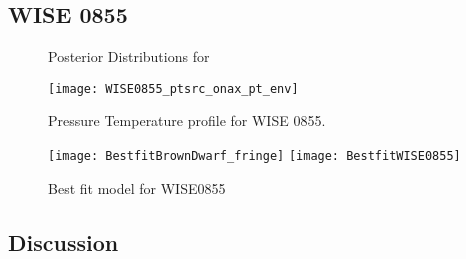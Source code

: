 \subsection{WISE 0855}
\begin{figure}[h]
	\caption{Posterior Distributions for}
	\label{fig:postWISE}
\end{figure}
\begin{figure}[h]
	\texttt{[image: WISE0855\_ptsrc\_onax\_pt\_env]}
	\caption{Pressure Temperature profile for WISE 0855.}
	\label{fig:presWISE}
\end{figure}
\begin{figure}[h]
	\texttt{[image: BestfitBrownDwarf\_fringe]}
	\texttt{[image: BestfitWISE0855]}
	\caption{Best fit model for WISE0855}
	\label{fig:bestfitWISE}
\end{figure}
\subsection{Discussion}
